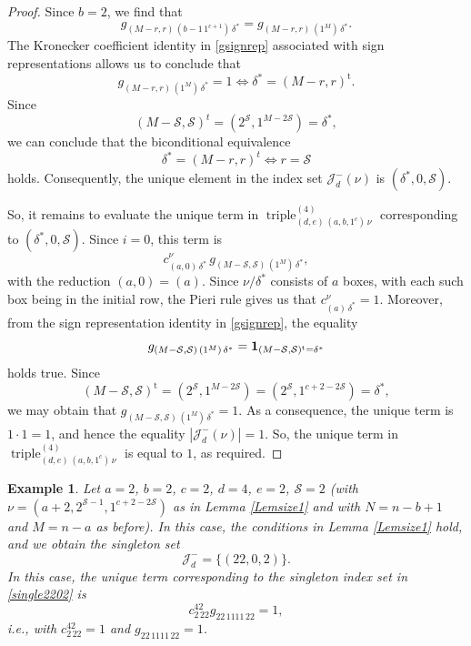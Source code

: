 \documentclass[12pt]{article}
\newtheorem{example}{Example}
\begin{document}
\begin{proof}
 Since $b =2$, we find that $$ g_{(M-r,r) \, (b-1 \, 1^{c+1}) \, \delta^{\ast} } = g_{(M-r, r) \, (1^{M}) \, \delta^{\ast}}. $$ The Kronecker 
 coefficient identity in \eqref{gsignrep} associated with sign representations allows us to conclude that $$ g_{(M-r,r) \, (1^M) \, 
 \delta^{\ast} } = 1 \Longleftrightarrow \delta^{\ast} = (M-r,r)^{\operatorname{t}}. $$ Since $$ (M-\mathcal{S}, 
 \mathcal{S})^t=(2^{\mathcal{S}},1^{M-2\mathcal{S}})=\delta^\ast, $$ we can conclude that the biconditional equivalence 
 $$ \delta^\ast=(M-r,r)^t \Longleftrightarrow r=\mathcal S $$ holds. Consequently, the unique element in 
 the index set $\mathcal{J}_{d}^{-}(\nu)$ is $(\delta^{\ast}, 0, \mathcal{S})$. 

 So, it remains to evaluate the unique term in $\operatorname{triple}^{(4)}_{(d,e)\,(a,b,1^c)\,\nu}$ corresponding to $(\delta^\ast, 0, 
 \mathcal S)$. Since $i=0$, this term is $$ c_{(a,0) \, \delta^\ast}^{\nu} \, g_{(M-\mathcal S,\mathcal S)\,(1^M)\,\delta^\ast}, $$ with 
 the reduction $(a,0)=(a)$. Since $\nu/\delta^\ast$ consists of $a$ boxes, with each such box being in the initial row, the Pieri rule gives 
 us that $ c_{(a)\,\delta^\ast}^{\nu}=1$. Moreover, from the sign representation identity in \eqref{gsignrep}, the equality 
 $$ g_{ (M - \mathcal{S}, \mathcal{S}) \, (1^{M}) \, \delta^{\ast} } = \text{{\bf 1}}_{ (M - \mathcal{S}, \mathcal{S} )^{\operatorname{t}} 
 = \delta^{\ast}} $$ holds true. Since $$ (M - \mathcal{S}, \mathcal{S})^{\operatorname{t}} = (2^{\mathcal{S}}, 1^{M - 2 \mathcal{S}}) = 
 (2^{\mathcal{S}}, 1^{c + 2 - 2\mathcal{S}}) = \delta^\ast, $$ we may obtain that $ g_{(M - \mathcal{S}, \mathcal{S}) \, (1^M) \, 
 \delta^\ast}=1$. As a consequence, the unique term is $1\cdot 1=1$, and hence the equality 
 $ |\mathcal J_d^{-}(\nu)|=1$. So, the unique term in $\operatorname{triple}^{(4)}_{(d,e)\,(a,b,1^c)\,\nu}$
 is equal to $1$, as required. 
\end{proof}

\begin{example}
 Let $a = 2$, $b = 2$, $c = 2$, $d = 4$, $e = 2$, $\mathcal{S} = 2$ (with $\nu = (a+2, 2^{\mathcal{S}-1}, 1^{c+2-2\mathcal{S}})$ as 
 in Lemma \ref{Lemsize1} and with $N = n - b +1$ and $M = n - a$ as before). In this case, 
 the conditions in Lemma \ref{Lemsize1} hold, and we obtain the singleton set
\begin{equation}\label{single2202} 
 \mathcal{J}_{d}^{-} = \big\{ (22, 0, 2) \big\}. 
\end{equation}
 In this case, the unique term corresponding to the singleton index set in \eqref{single2202} is $$ c_{2 \, 22}^{42} g_{22 \, 1111 \, 22} = 
 1, $$ i.e., with $ c_{2 \, 22}^{42} = 1$ and $g_{22 \, 1111 \, 22} = 1$. 
\end{example}
\end{document}
